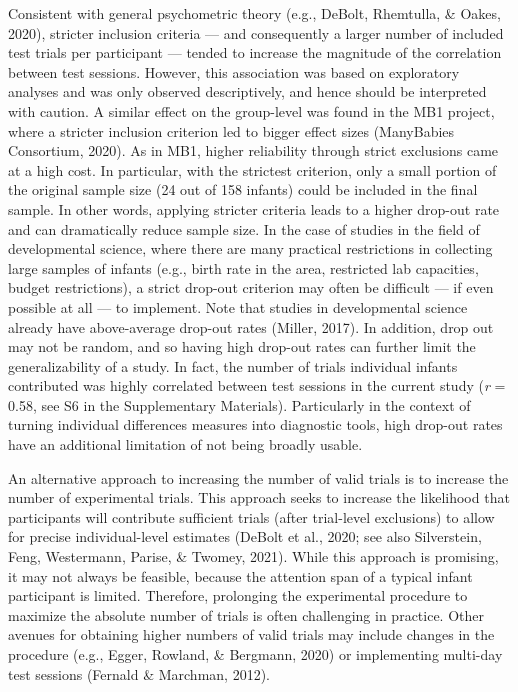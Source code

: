 \documentclass[
  man,floatsintext]{apa6}
\begin{document}
Consistent with general psychometric theory (e.g., DeBolt, Rhemtulla, \& Oakes, 2020), stricter inclusion criteria --- and consequently a larger number of included test trials per participant --- tended to increase the magnitude of the correlation between test sessions.
However, this association was based on exploratory analyses and was only observed descriptively, and hence should be interpreted with caution.
A similar effect on the group-level was found in the MB1 project, where a stricter inclusion criterion led to bigger effect sizes (ManyBabies Consortium, 2020).
As in MB1, higher reliability through strict exclusions came at a high cost.
In particular, with the strictest criterion, only a small portion of the original sample size (24 out of 158 infants) could be included in the final sample.
In other words, applying stricter criteria leads to a higher drop-out rate and can dramatically reduce sample size.
In the case of studies in the field of developmental science, where there are many practical restrictions in collecting large samples of infants (e.g., birth rate in the area, restricted lab capacities, budget restrictions), a strict drop-out criterion may often be difficult --- if even possible at all --- to implement.
Note that studies in developmental science already have above-average drop-out rates (Miller, 2017).
In addition, drop out may not be random, and so having high drop-out rates can further limit the generalizability of a study.
In fact, the number of trials individual infants contributed was highly correlated between test sessions in the current study (\emph{r} = 0.58, see S6 in the Supplementary Materials).
Particularly in the context of turning individual differences measures into diagnostic tools, high drop-out rates have an additional limitation of not being broadly usable.

An alternative approach to increasing the number of valid trials is to increase the number of experimental trials.
This approach seeks to increase the likelihood that participants will contribute sufficient trials (after trial-level exclusions) to allow for precise individual-level estimates (DeBolt et al., 2020; see also Silverstein, Feng, Westermann, Parise, \& Twomey, 2021).
While this approach is promising, it may not always be feasible, because the attention span of a typical infant participant is limited.
Therefore, prolonging the experimental procedure to maximize the absolute number of trials is often challenging in practice.
Other avenues for obtaining higher numbers of valid trials may include changes in the procedure (e.g., Egger, Rowland, \& Bergmann, 2020) or implementing multi-day test sessions (Fernald \& Marchman, 2012).
\end{document}
